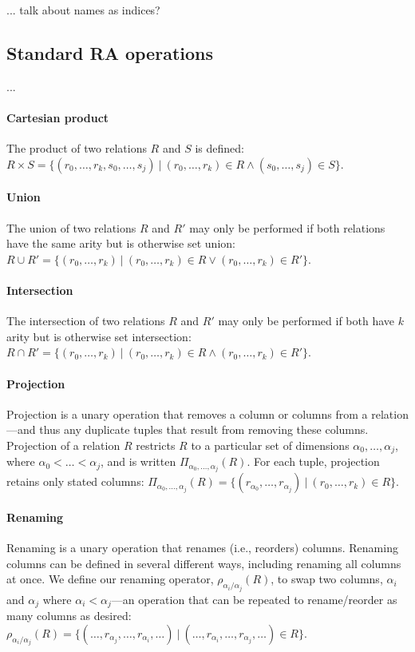 ... talk about names as indices?


\subsection{Standard RA operations}
\label{sec:ra:tc}
%
...

\paragraph{Cartesian product} The product of two relations $R$ and $S$ is defined: $R \times S = \{ (r_0, \ldots, r_k, s_0, \ldots, s_j) \ |\ (r_0, \ldots, r_k) \in R \wedge (s_0, \ldots, s_j) \in S \}$.


\paragraph{Union} The union of two relations $R$ and $R'$ may only be performed if both relations have the same arity but is otherwise set union: $R \cup R' = \{ (r_0, \ldots, r_k) \ |\ (r_0, \ldots, r_k) \in R \vee (r_0, \ldots, r_k) \in R' \}$.


\paragraph{Intersection} The intersection of two relations $R$ and $R'$ may only be performed if both have $k$ arity but is otherwise set intersection: $R \cap R' = \{ (r_0, \ldots, r_k) \ |\ (r_0, \ldots, r_k) \in R \wedge (r_0, \ldots, r_k) \in R' \}$.


\paragraph{Projection} Projection is a unary operation that removes a column or columns from a relation---and thus any duplicate tuples that result from removing these columns. Projection of a relation $R$ restricts $R$ to a particular set of dimensions ${\alpha_0, \ldots, \alpha_j}$, where $\alpha_0 < \ldots < \alpha_j$, and is written $\Pi_{\alpha_0,\ldots,\alpha_j}(R)$. For each tuple, projection retains only stated columns: $\Pi_{\alpha_0,\ldots,\alpha_j}(R) = \{ (r_{\alpha_0}, \ldots, r_{\alpha_j}) \ |\  (r_0, \ldots, r_k) \in R \}$.


\paragraph{Renaming} Renaming is a unary operation that renames (i.e., reorders) columns. Renaming columns can be defined in several different ways, including renaming all columns at once. We define our renaming operator, $\rho_{\alpha_i / \alpha_j}(R)$, to swap two columns, $\alpha_i$ and $\alpha_j$ where $\alpha_i < \alpha_j$---an operation that can be repeated to rename/reorder as many columns as desired: \newline$\rho_{\alpha_i / \alpha_j}(R) = \{ (\ldots,r_{\alpha_j},\ldots,r_{\alpha_{i}},\ldots) \ |\ (\ldots,r_{\alpha_{i}},\ldots,r_{\alpha_{j}},\ldots) \in R \}$.


